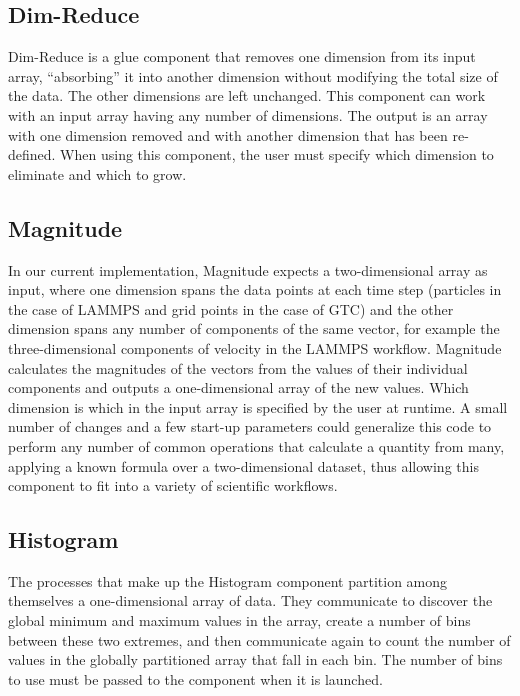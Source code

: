 \documentclass[conference]{IEEEtran}
\begin{document}
\subsection{Dim-Reduce}

Dim-Reduce is a glue component that removes one dimension from its
input array, ``absorbing'' it into another dimension without modifying the
total size of the data. The other dimensions are left unchanged. This component
can work with an input array having any number of dimensions. The output is an
array with one dimension removed and with another dimension that has been
re-defined. When using this component, the user must specify which
dimension to eliminate and which to grow.

\subsection{Magnitude}

In our current implementation, Magnitude expects a two-dimensional array as
input, where one dimension spans the data points at each time step (particles
in the case of LAMMPS and grid points in the case of GTC) and the other
dimension spans any number of components of the same vector, for example the
three-dimensional components of velocity in the LAMMPS workflow. Magnitude
calculates the magnitudes of the vectors from the values of their
individual components and outputs
a one-dimensional array of the new values. Which dimension is which in the input
array is specified by the user at runtime. A small number of changes and a few
start-up parameters could generalize this code to perform any number of
common operations that calculate a quantity from many,
applying a known formula over a two-dimensional dataset, thus
allowing this component to fit into a variety of scientific workflows.

\subsection{Histogram}

The processes that make up the Histogram component partition among themselves
a one-dimensional array of data. They communicate to discover the global
minimum and maximum values in the array, create a number of bins between these
two extremes, and then communicate again to count the number of values in the
globally partitioned array that fall in each bin. The number of bins to use
must be passed to the component when it is launched.
\end{document}

